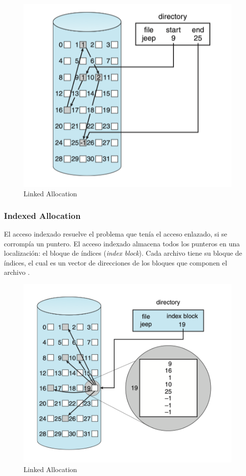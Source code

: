 \begin{figure}[H]
    \centering
    \includegraphics[scale=0.6]{doc/assets/images/Allocation Methods/linked.png}
    \caption{Linked Allocation}
    \label{fig:my_label}
\end{figure}

\subsubsection{Indexed Allocation}
El acceso indexado resuelve el problema que tenía el acceso enlazado, si se corrompía un puntero. El acceso indexado almacena todos los punteros en una localización: el bloque de índices (\textit{index block}). 
Cada archivo tiene su bloque de índices, el cual es un vector de direcciones de los bloques que componen el archivo \cite{silberchatz}.


\begin{figure}[H]
    \centering
    \includegraphics[scale=0.6]{doc/assets/images/Allocation Methods/indexed.png}
    \caption{Linked Allocation}
    \label{fig:my_label}
\end{figure}


